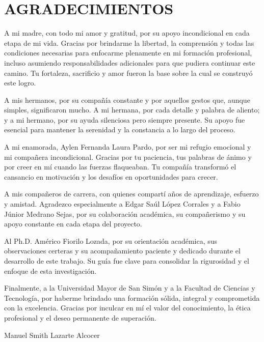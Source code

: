 \chapter*{AGRADECIMIENTOS}

A mi madre, con todo mi amor y gratitud, por su apoyo incondicional en cada etapa de mi vida.
Gracias por brindarme la libertad, la comprensión y todas las condiciones necesarias para enfocarme plenamente en mi formación profesional, incluso asumiendo responsabilidades adicionales para que pudiera continuar este camino.
Tu fortaleza, sacrificio y amor fueron la base sobre la cual se construyó este logro.

A mis hermanos, por su compañía constante y por aquellos gestos que, aunque simples, significaron mucho.
A mi hermana, por cada detalle y palabra de aliento; y a mi hermano, por su ayuda silenciosa pero siempre presente.
Su apoyo fue esencial para mantener la serenidad y la constancia a lo largo del proceso.

A mi enamorada, Aylen Fernanda Laura Pardo, por ser mi refugio emocional y mi compañera incondicional.
Gracias por tu paciencia, tus palabras de ánimo y por creer en mí cuando las fuerzas flaqueaban.
Tu compañía transformó el cansancio en motivación y los desafíos en oportunidades para crecer.

A mis compañeros de carrera, con quienes compartí años de aprendizaje, esfuerzo y amistad.
Agradezco especialmente a Edgar Saúl López Corrales y a Fabio Júnior Medrano Sejas, por su colaboración académica, su compañerismo y su apoyo constante en cada etapa del proyecto.

Al Ph.D. Américo Fiorilo Lozada, por su orientación académica, sus observaciones certeras y su acompañamiento paciente y dedicado durante el desarrollo de este trabajo.
Su guía fue clave para consolidar la rigurosidad y el enfoque de esta investigación.

Finalmente, a la Universidad Mayor de San Simón y a la Facultad de Ciencias y Tecnología, por haberme brindado una formación sólida, integral y comprometida con la excelencia.
Gracias por inculcar en mí el valor del conocimiento, la ética profesional y el deseo permanente de superación.

\vspace{1cm}
\begin{flushright}
Manuel Smith Lazarte Alcocer
\end{flushright}
